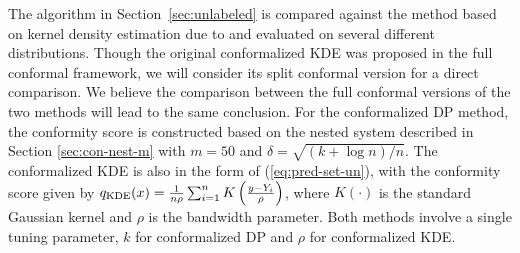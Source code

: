 The algorithm in Section~\ref{sec:unlabeled} is compared against the method based on kernel density estimation due to \citet{Lei2013DistributionFreePS} and evaluated on several different  distributions. 
Though the original conformalized KDE was proposed in the full conformal framework, we will consider its split conformal version for a direct comparison. We believe the comparison between the full conformal versions of the two methods will lead to the same conclusion.
For the conformalized DP method, the conformity score is constructed based on the nested system described in Section \ref{sec:con-nest-m} with $m=50$ and $\delta = \sqrt{(k + \log n)/n}$. 
The conformalized KDE is also in the form of (\ref{eq:pred-set-un}), with the conformity score given by
$q_{\rm KDE}(x)=\frac{1}{n\rho}\sum_{i=1}^nK\left(\frac{y-Y_i}{\rho}\right)$,
where $K(\cdot)$ is the standard Gaussian kernel and $\rho$ is the bandwidth parameter.
Both methods involve a single tuning parameter, $k$ for conformalized DP and $\rho$ for conformalized KDE.
